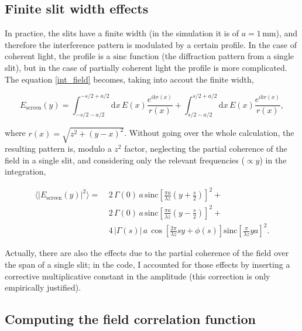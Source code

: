 \subsection{Finite slit width effects}

In practice, the slits have a finite width (in the simulation it is of $a = 1 \, \mathrm{mm}$), and therefore the interference pattern is modulated by a certain 
profile. In the case of coherent light, the profile is a $\mathrm{sinc}$ function (the diffraction pattern from a single slit), but in the case of partially 
coherent light the profile is more complicated. The equation \eqref{int_field} becomes, taking into accout the finite width,

\begin{equation}
    E_{\text{screen}}(y) = \int_{-s/2-a/2}^{-s/2 + a/2} \mathrm dx \, E(x)\frac{e^{ikr(x)}}{r(x)} + \int_{s/2-a/2}^{s/2 + a/2} \mathrm dx \, E(x)\frac{e^{ikr(x)}}{r(x)},
\end{equation}

where $r(x) = \sqrt{z^2 + (y - x)^2}$. Without going over the whole calculation, the resulting pattern is, modulo a $z^2$ factor, 
neglecting the partial coherence of the field in a single slit, and considering only the relevant frequencies ($\propto y$) in the integration,

\begin{equation}
    \begin{split}
        \langle |E_{\text{screen}}(y)|^2 \rangle =& \ 2 \, \Gamma(0) \, a \, \mathrm{sinc}\left[ \frac{\pi a}{\lambda z} \left( y + \frac s2 \right) \right]^2 + \\
        & \ 2 \, \Gamma(0) \, a \, \mathrm{sinc}\left[ \frac{\pi a}{\lambda z} \left( y - \frac s2 \right) \right]^2 + \\
        & \ 4 \, |\Gamma(s)| \, a \, \cos\left[ \frac{2\pi}{\lambda z} sy + \phi(s) \right] \mathrm{sinc}\left[ \frac{\pi}{\lambda z} ya \right]^2.
    \end{split}
\end{equation}

Actually, there are also the effects due to the partial coherence of the field over the span of a single slit; in the code, I accounted for those effects by 
inserting a corrective multiplicative constant in the amplitude (this correction is only empirically justified).

\subsection{Computing the field correlation function} \label{comp_corr}

